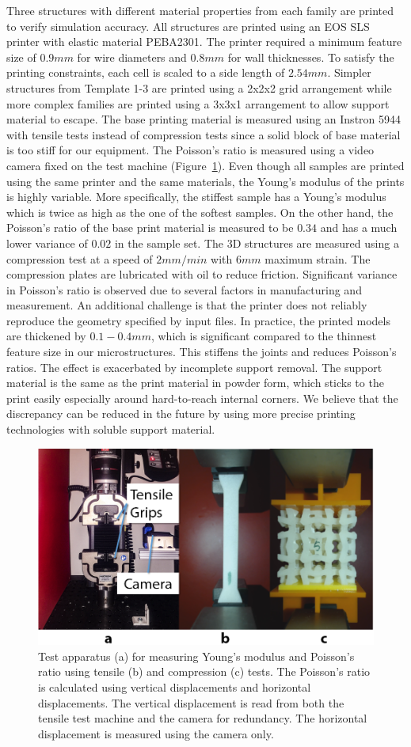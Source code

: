 Three structures with different material properties from each family are printed to verify simulation accuracy.
All structures are printed using an EOS SLS printer with elastic material PEBA2301.
The printer required a minimum feature size of $0.9mm$ for wire diameters and $0.8mm$ for wall thicknesses.
To satisfy the printing constraints, each cell is scaled to a side length of $2.54mm$.
Simpler structures from Template 1-3 are printed using a 2x2x2 grid arrangement while more complex families are printed using a 3x3x1 arrangement to allow support material to escape.
The base printing material is measured using an Instron 5944 with tensile tests instead of compression tests since a solid block of base material is too stiff for our equipment.
The Poisson’s ratio is measured using a video camera fixed on the test machine (Figure~\ref{fig:measure}).
Even though all samples are printed using the same printer and the same materials, the Young’s modulus of the prints is highly variable.
More specifically, the stiffest sample has a Young’s modulus which is twice as high as the one of the softest samples.
On the other hand, the Poisson’s ratio of the base print material is measured to be $0.34$ and has a much lower variance of $0.02$ in the sample set.
The 3D structures are measured using a compression test at a speed of $2mm/min$ with $6mm$ maximum strain.
The compression plates are lubricated with oil to reduce friction.
Significant variance in Poisson’s ratio is observed due to several factors in manufacturing and measurement.
An additional challenge is that the printer does not reliably reproduce the geometry specified by input files.
In practice, the printed models are thickened by $0.1-0.4mm$, which is significant compared to the thinnest feature size in our microstructures.
This stiffens the joints and reduces Poisson’s ratios.
The effect is exacerbated by incomplete support removal.
The support material is the same as the print material in powder form, which sticks to the print easily especially around hard-to-reach internal corners.
We believe that the discrepancy can be reduced in the future by using more precise printing technologies with soluble support material.
\begin{figure}
	\includegraphics[width=0.5\columnwidth]{images/measure.png}
	\caption{Test apparatus (a) for measuring Young’s modulus and Poisson’s ratio using tensile (b) and compression (c) tests. The Poisson’s ratio is calculated using vertical displacements and horizontal displacements. The vertical displacement is read from both the tensile test machine and the camera for redundancy. The horizontal displacement is measured using the camera only.}
	\label{fig:measure}
\end{figure}
